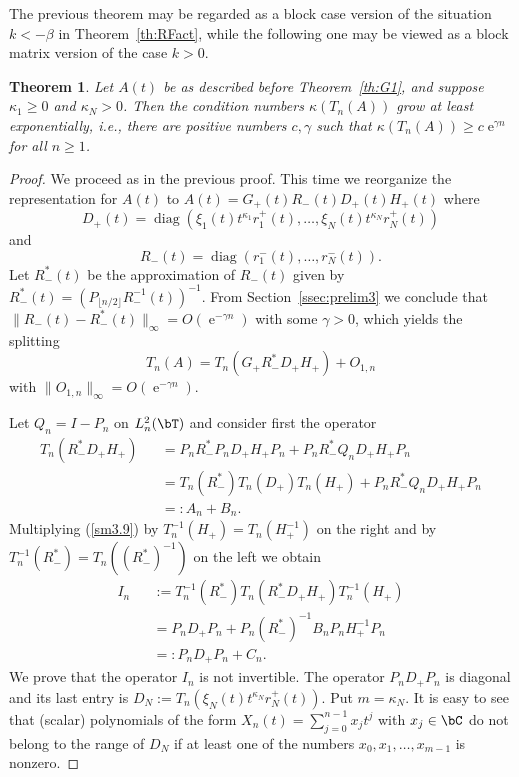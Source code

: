 \documentclass[addpoints,12pt,letter]{article}
\DeclareMathOperator{\diag}{diag}
\DeclareMathOperator{\e}{e}
\newcommand{\be}{\beta}
\newcommand{\ga}{\gamma}
\newcommand{\ka}{\kappa}
\newcommand{\nf}{\infty}
\renewcommand{\ge}{\geqslant}
\numberwithin{equation}{section}
\newtheorem{theorem}[lemma]{Theorem}
\theoremstyle{definition}
\begin{document}
The previous theorem may be regarded as a block case version of the situation $k<-\be$ in Theorem~\ref{th:RFact}, while the following one may be viewed as a block matrix version of the case $k>0$.

\begin{theorem}\label{th:3.9}
Let $A(t)$ be as described before Theorem~\ref{th:G1}, and suppose $\ka_1 \ge 0$ and $\ka_N>0$. Then the condition numbers $\ka(T_{n}(A))$ grow at least exponentially, i.e., there are positive numbers $c,\ga$ such that $\ka(T_{n}(A))\ge c\e^{\ga n}$ for all $n\ge 1$.
\end{theorem}

\begin{proof}
We proceed as in the previous proof.
This time we reorganize the representation for $A(t)$ to $A(t)=G_{+}(t)R_{-}(t)D_{+}(t)H_{+}(t)$ where
\[
D_{+}(t)=\diag(\xi_{1}(t)t^{\ka_{1}}r_{1}^{+}(t),\ldots, \xi_N(t)t^{\ka_N}r_N^{+}(t))
\]
and
\[
R_{-}(t)=\diag(r_{1}^{-}(t),\ldots, r_N^{-}(t)).
\]
Let $R_{-}^{\ast}(t)$ be the approximation of $R_{-}(t)$ given by $R_{-}^{\ast}(t)=(P_{\lfloor n/2 \rfloor}R_{-}^{-1}(t))^{-1}$.
From Section~\ref{ssec:prelim3} we conclude that $\|R_{-}(t)-R_{-}^{\ast}(t)\|_{\nf}=O(\e^{-\ga n})$ with some $\ga>0$, which yields the splitting
\begin{equation}\label{sm3.8}
T_{n}(A)=T_{n}(G_{+}R_{-}^{\ast}D_{+}H_{+})+O_{1,n}
\end{equation}
with $\|O_{1,n}\|_{\nf}=O(\e^{-\ga n})$.

Let $Q_{n}=I-P_{n}$ on $L^{2}_{n}(\bT)$ and consider first the operator
\begin{eqnarray}\label{sm3.9}
T_{n}(R_{-}^{\ast}D_{+}H_{+})& &=P_{n}R_{-}^{\ast}P_{n}D_{+}H_{+}P_{n}+P_{n}R_{-}^{\ast}Q_{n}D_{+}H_{+}P_{n}\nonumber\\
& &=T_{n}(R_{-}^{\ast})T_{n}(D_{+})T_{n}(H_{+})+P_{n}R_{-}^{\ast}Q_{n}D_{+}H_{+}P_{n}\\
& &=:A_{n}+B_{n}\nonumber.
\end{eqnarray}
Multiplying (\ref{sm3.9}) by $T_{n}^{-1}(H_{+})=T_{n}(H_{+}^{-1})$ on the right and by $T_{n}^{-1}(R_{-}^{\ast})=T_{n}((R_{-}^{\ast})^{-1})$ on the left we obtain
\begin{eqnarray*}
I_{n} & &:=T_{n}^{-1}(R_{-}^{\ast})T_{n}(R_{-}^{\ast}D_{+}H_{+})T_{n}^{-1}(H_{+})\\
& &=P_{n}D_{+}P_{n}+P_{n}(R_{-}^{\ast})^{-1}B_{n}P_{n}H_{+}^{-1}P_{n}\\
& &=: P_{n}D_{+}P_{n}+C_{n}.
\end{eqnarray*}
We prove that the operator $I_{n}$ is not invertible.
The operator $P_{n}D_{+}P_{n}$ is diagonal and its last entry is $D_N:=T_{n}(\xi_N(t)t^{\ka_N}r_N^{+}(t))$.
Put $m=\ka_N$.
It is easy to see that (scalar) polynomials of the form $X_{n}(t)=\sum_{j=0}^{n-1}x_{j}t^{j}$ with $x_{j}\in\bC$ do not belong to the range of $D_N$ if at least one of the numbers $x_{0},x_{1},\ldots,x_{m-1}$ is nonzero.


\end{proof}
\end{document}
